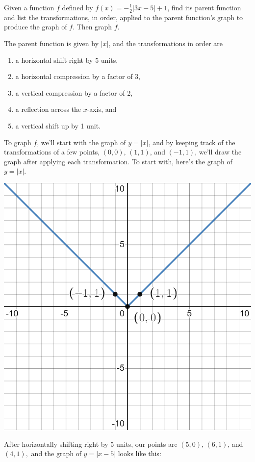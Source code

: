 \documentclass[handout, noauthor, nooutcomes]{ximera}
\begin{document}
\begin{example}
Given a function $f$ defined by $f(x) = -\frac{1}{2}|3x - 5| + 1$, find its parent function and list the transformations, in order, applied to the parent function's graph to produce the graph of $f$. Then graph $f$.
\begin{explanation}
The parent function is given by $|x|$, and the transformations in order are 
\begin{enumerate}
\item a horizontal shift right by 5 units,
\item a horizontal compression by a factor of 3,
\item a vertical compression by a factor of 2,
\item a reflection across the $x$-axis, and
\item a vertical shift up by 1 unit.
\end{enumerate}

To graph $f$, we'll start with the graph of $y = |x|$, and by keeping track of the transformations of a few points, $(0, 0)$, $(1, 1)$, and $(-1, 1)$,  we'll draw the graph after applying each transformation. To start with, here's the graph of $y = |x|$. 

\includegraphics[width=1\linewidth]{images/exgraph1.png}

After horizontally shifting right  by 5 units, our points are $(5, 0)$, $(6, 1)$, and $(4, 1),$ and the graph of $y = |x - 5|$ looks like this:


\end{explanation}
\end{example}
\end{document}
